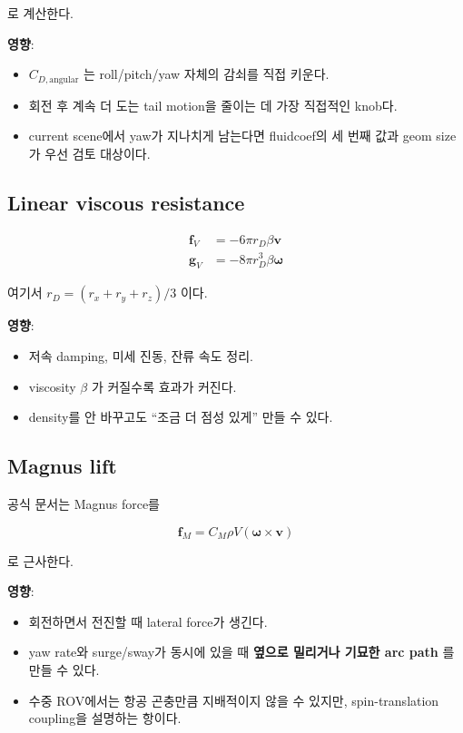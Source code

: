 \documentclass[11pt,a4paper]{article}
\begin{document}
로 계산한다.

\textbf{영향}:
\begin{itemize}[leftmargin=2em]
  \item \(C_{D,\text{angular}}\) 는 roll/pitch/yaw 자체의 감쇠를 직접 키운다.
  \item 회전 후 계속 더 도는 tail motion을 줄이는 데 가장 직접적인 knob다.
  \item current scene에서 yaw가 지나치게 남는다면 fluidcoef의 세 번째 값과 geom size가 우선 검토 대상이다.
\end{itemize}

\subsection{Linear viscous resistance}

\begin{align*}
\mathbf{f}_V &= -6\pi r_D \beta \mathbf{v} \\
\mathbf{g}_V &= -8\pi r_D^3 \beta \boldsymbol{\omega}
\end{align*}

여기서 \(r_D = (r_x+r_y+r_z)/3\) 이다.

\textbf{영향}:
\begin{itemize}[leftmargin=2em]
  \item 저속 damping, 미세 진동, 잔류 속도 정리.
  \item viscosity \(\beta\) 가 커질수록 효과가 커진다.
  \item density를 안 바꾸고도 ``조금 더 점성 있게'' 만들 수 있다.
\end{itemize}

\subsection{Magnus lift}

공식 문서는 Magnus force를

\[
\mathbf{f}_M = C_M \rho V (\boldsymbol{\omega}\times\mathbf{v})
\]

로 근사한다.

\textbf{영향}:
\begin{itemize}[leftmargin=2em]
  \item 회전하면서 전진할 때 lateral force가 생긴다.
  \item yaw rate와 surge/sway가 동시에 있을 때 \textbf{옆으로 밀리거나 기묘한 arc path} 를 만들 수 있다.
  \item 수중 ROV에서는 항공 곤충만큼 지배적이지 않을 수 있지만, spin-translation coupling을 설명하는 항이다.
\end{itemize}
\end{document}
